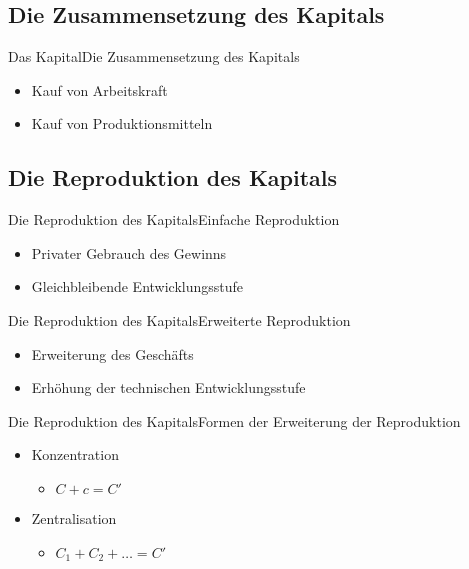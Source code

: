 \documentclass[10pt,a4paper, ngerman]{beamer}
\begin{document}
\subsection{Die Zusammensetzung des Kapitals}
\begin{frame}{Das Kapital}{Die Zusammensetzung des Kapitals}
\begin{itemize}
	\item Kauf von Arbeitskraft
	\item Kauf von Produktionsmitteln
\end{itemize}
\end{frame}

\subsection{Die Reproduktion des Kapitals}
\begin{frame}{Die Reproduktion des Kapitals}{Einfache Reproduktion}
\begin{itemize}
	\item Privater Gebrauch des Gewinns
	\item Gleichbleibende Entwicklungsstufe
\end{itemize}
\end{frame}

\begin{frame}{Die Reproduktion des Kapitals}{Erweiterte Reproduktion}
\begin{itemize}
	\item Erweiterung des Geschäfts
	\item Erhöhung der technischen Entwicklungsstufe
\end{itemize}
\end{frame}

\begin{frame}{Die Reproduktion des Kapitals}{Formen der Erweiterung der Reproduktion}
\begin{itemize}
	\item Konzentration
	\begin{itemize}
		\item \(C+c=C'\)
	\end{itemize} \pause
	\item Zentralisation
	\begin{itemize}
		\item \(C_{1}+C_{2}+\ldots =C'\)
	\end{itemize}
\end{itemize}
\end{frame}
\end{document}
